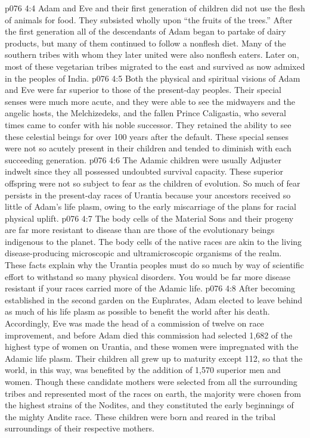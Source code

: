 \vs p076 4:4 Adam and Eve and their first generation of children did not use the flesh of animals for food. They subsisted wholly upon “the fruits of the trees.” After the first generation all of the descendants of Adam began to partake of dairy products, but many of them continued to follow a nonflesh diet. Many of the southern tribes with whom they later united were also nonflesh eaters. Later on, most of these vegetarian tribes migrated to the east and survived as now admixed in the peoples of India.
\vs p076 4:5 Both the physical and spiritual visions of Adam and Eve were far superior to those of the present\hyp{}day peoples. Their special senses were much more acute, and they were able to see the midwayers and the angelic hosts, the Melchizedeks, and the fallen Prince Caligastia, who several times came to confer with his noble successor. They retained the ability to see these celestial beings for over 100 years after the default. These special senses were not so acutely present in their children and tended to diminish with each succeeding generation.
\vs p076 4:6 The Adamic children were usually Adjuster indwelt since they all possessed undoubted survival capacity. These superior offspring were not so subject to fear as the children of evolution. So much of fear persists in the present\hyp{}day races of Urantia because your ancestors received so little of Adam’s life plasm, owing to the early miscarriage of the plans for racial physical uplift.
\vs p076 4:7 The body cells of the Material Sons and their progeny are far more resistant to disease than are those of the evolutionary beings indigenous to the planet. The body cells of the native races are akin to the living disease\hyp{}producing microscopic and ultramicroscopic organisms of the realm. These facts explain why the Urantia peoples must do so much by way of scientific effort to withstand so many physical disorders. You would be far more disease resistant if your races carried more of the Adamic life.
\vs p076 4:8 \pc After becoming established in the second garden on the Euphrates, Adam elected to leave behind as much of his life plasm as possible to benefit the world after his death. Accordingly, Eve was made the head of a commission of twelve on race improvement, and before Adam died this commission had selected 1,682 of the highest type of women on Urantia, and these women were impregnated with the Adamic life plasm. Their children all grew up to maturity except 112, so that the world, in this way, was benefited by the addition of 1,570 superior men and women. Though these candidate mothers were selected from all the surrounding tribes and represented most of the races on earth, the majority were chosen from the highest strains of the Nodites, and they constituted the early beginnings of the mighty Andite race. These children were born and reared in the tribal surroundings of their respective mothers.
